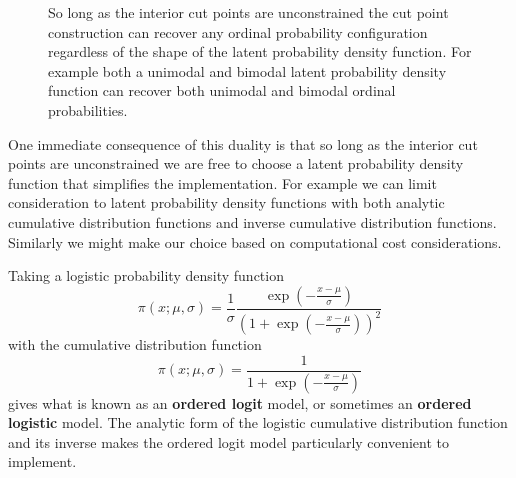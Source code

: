 \documentclass[
  letterpaper,
  DIV=11,
  numbers=noendperiod]{scrartcl}
\begin{document}
\begin{figure}


\caption{\label{fig-cut-point-flex}So long as the interior cut points
are unconstrained the cut point construction can recover any ordinal
probability configuration regardless of the shape of the latent
probability density function. For example both a unimodal and bimodal
latent probability density function can recover both unimodal and
bimodal ordinal probabilities.}

\end{figure}%

One immediate consequence of this duality is that so long as the
interior cut points are unconstrained we are free to choose a latent
probability density function that simplifies the implementation. For
example we can limit consideration to latent probability density
functions with both analytic cumulative distribution functions and
inverse cumulative distribution functions. Similarly we might make our
choice based on computational cost considerations.

Taking a logistic probability density function \[
\pi(x; \mu, \sigma)
=
\frac{1}{\sigma}
\frac{ \exp \left( - \frac{ x - \mu }{ \sigma } \right) }
{ \left( 1 + \exp \left( - \frac{ x - \mu }{ \sigma } \right) \right)^{2} }
\] with the cumulative distribution function \[
\pi(x; \mu, \sigma)
=
\frac{ 1 }{ 1 + \exp \left( - \frac{ x - \mu }{ \sigma } \right) }
\] gives what is known as an \textbf{ordered logit} model, or sometimes
an \textbf{ordered logistic} model. The analytic form of the logistic
cumulative distribution function and its inverse makes the ordered logit
model particularly convenient to implement.
\end{document}
